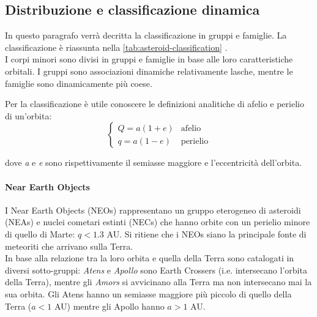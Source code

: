 \documentclass[a4paper,11pt,openright]{book}
\begin{document}
\subsection{Distribuzione e classificazione dinamica}
In questo paragrafo verrà decritta la classificazione in gruppi e famiglie.
La classificazione è riassunta nella \cref{tab:asteroid-classification} .\\
I corpi minori sono divisi in gruppi e famiglie in base alle loro caratteristiche orbitali. 
I gruppi sono associazioni dinamiche relativamente lasche, mentre le famiglie sono dinamicamente più coese.

Per la classificazione è utile conoscere le definizioni analitiche di afelio e perielio di un'orbita:
\begin{equation}
    \begin{cases}
        Q=a(1+e) &\text{afelio}\\
        q=a(1-e) &\text{perielio}
    \end{cases}
\end{equation}

dove \textit{a} e \textit{e} sono rispettivamente il semiasse maggiore e l'eccentricità dell'orbita.

\paragraph*{Near Earth Objects}\label{sec:neo}
I Near Earth Objects (NEOs) rappresentano un gruppo eterogeneo di asteroidi (NEAs) e nuclei cometari estinti (NECs) che hanno orbite con un perielio minore di quello di Marte: $q<1.3$ AU. Si ritiene che i NEOs siano la principale fonte di meteoriti che arrivano sulla Terra.\\
In base alla relazione tra la loro orbita e quella della Terra sono catalogati in diversi sotto-gruppi: \textit{Atens} e \textit{Apollo} sono Earth Crossers (i.e. intersecano l’orbita della Terra), mentre gli \textit{Amors} si avvicinano alla Terra ma non intersecano mai la sua orbita. Gli Atens hanno un semiasse maggiore più piccolo di quello della Terra ($a<1$ AU) mentre gli Apollo hanno $a>1$ AU.
\end{document}
